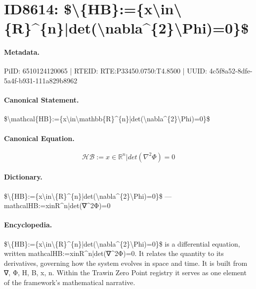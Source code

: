 \section*{ID8614: \$\textbackslash{}\{HB\}:=\{x\textbackslash{}in\textbackslash{}\{R\}\textasciicircum{}\{n\}|det(\textbackslash{}nabla\textasciicircum{}\{2\}\textbackslash{}Phi)=0\}\$}
\paragraph{Metadata.}
PiID: 6510124120065 | RTEID: RTE:P33450.0750:T4.8500 | UUID: 4c5f8a52-8dfe-5a4f-b931-111a829b8962

\paragraph{Canonical Statement.}
\$\textbackslash{}mathcal\{HB\}:=\{x\textbackslash{}in\textbackslash{}mathbb\{R\}\textasciicircum{}\{n\}|det(\textbackslash{}nabla\textasciicircum{}\{2\}\textbackslash{}Phi)=0\}\$

\paragraph{Canonical Equation.}
\[
\mathcal{HB}:={x\in\mathbb{R}^{n}|det(\nabla^{2}\Phi)=0}
\]

\paragraph{Dictionary.}
\$\textbackslash{}\{HB\}:=\{x\textbackslash{}in\textbackslash{}\{R\}\textasciicircum{}\{n\}|det(\textbackslash{}nabla\textasciicircum{}\{2\}\textbackslash{}Phi)=0\}\$ — mathcalHB:=xinR\textasciicircum{}n|det(∇\textasciicircum{}2Φ)=0

\paragraph{Encyclopedia.}
\$\textbackslash{}\{HB\}:=\{x\textbackslash{}in\textbackslash{}\{R\}\textasciicircum{}\{n\}|det(\textbackslash{}nabla\textasciicircum{}\{2\}\textbackslash{}Phi)=0\}\$ is a differential equation, written mathcalHB:=xinR\textasciicircum{}n|det(∇\textasciicircum{}2Φ)=0. It relates the quantity to its derivatives, governing how the system evolves in space and time. It is built from ∇, Φ, H, B, x, n. Within the Trawin Zero Point registry it serves as one element of the framework's mathematical narrative.
